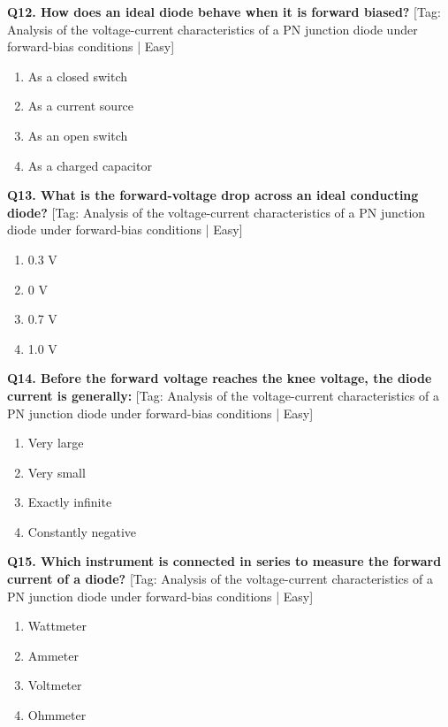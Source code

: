 \noindent\textbf{Q12. How does an ideal diode behave when it is forward biased?} \hfill [Tag: Analysis of the voltage-current characteristics of a PN junction diode under forward-bias conditions | Easy]
\begin{enumerate}[label=(\alph*),topsep=2pt,itemsep=1pt,partopsep=0pt,parsep=0pt]
    \item {As a closed switch}
    \item {As a current source}
    \item {As an open switch}
    \item {As a charged capacitor}
\end{enumerate}
\vspace{2mm}

\noindent\textbf{Q13. What is the forward-voltage drop across an ideal conducting diode?} \hfill [Tag: Analysis of the voltage-current characteristics of a PN junction diode under forward-bias conditions | Easy]
\begin{enumerate}[label=(\alph*),topsep=2pt,itemsep=1pt,partopsep=0pt,parsep=0pt]
    \item {0.3 V}
    \item {0 V}
    \item {0.7 V}
    \item {1.0 V}
\end{enumerate}
\vspace{2mm}

\noindent\textbf{Q14. Before the forward voltage reaches the knee voltage, the diode current is generally:} \hfill [Tag: Analysis of the voltage-current characteristics of a PN junction diode under forward-bias conditions | Easy]
\begin{enumerate}[label=(\alph*),topsep=2pt,itemsep=1pt,partopsep=0pt,parsep=0pt]
    \item {Very large}
    \item {Very small}
    \item {Exactly infinite}
    \item {Constantly negative}
\end{enumerate}
\vspace{2mm}

\noindent\textbf{Q15. Which instrument is connected in series to measure the forward current of a diode?} \hfill [Tag: Analysis of the voltage-current characteristics of a PN junction diode under forward-bias conditions | Easy]
\begin{enumerate}[label=(\alph*),topsep=2pt,itemsep=1pt,partopsep=0pt,parsep=0pt]
    \item {Wattmeter}
    \item {Ammeter}
    \item {Voltmeter}
    \item {Ohmmeter}
\end{enumerate}
\vspace{2mm}

